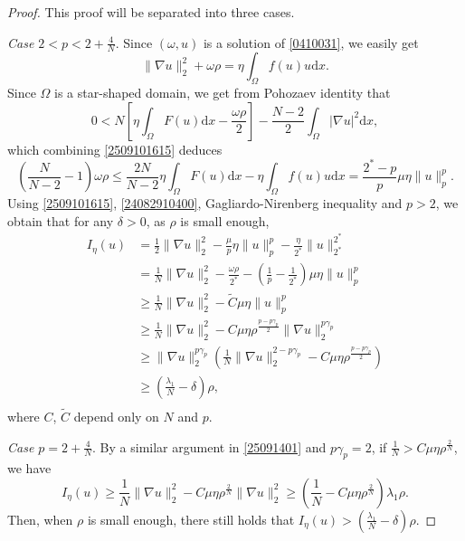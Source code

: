 \documentclass[10pt]{article}
\numberwithin{equation}{section}
\newcommand{\ud}{\mathrm{d}}
\numberwithin{equation}{section}
\begin{document}
\begin{proof}
This proof will be separated into three cases.

{\it Case $2<p< 2+\frac{4}{N}$}. Since $(\omega, u)$ is a solution of \eqref{0410031}, we easily get
\begin{equation}\label{2509101615}
\|\nabla u\|_2^2+\omega\rho=\eta\int_{\Omega}f(u)u\ud x.
\end{equation}
Since $\Omega$ is a star-shaped domain, we get from Pohozaev identity that
\begin{equation}\label{2509111048}
0< N\left[\eta\int_{\Omega}F(u)\ud x-\frac{\omega\rho}{2}\right]-\frac{N-2}{2}\int_{\Omega}|\nabla u|^2 \ud x,
\end{equation}
which combining \eqref{2509101615} deduces
\begin{equation}\label{24082910400}
\left(\frac{N}{N-2}-1\right)\omega\rho\le \frac{2N}{N-2}\eta\int_{\Omega}F(u)\ud x-\eta\int_{\Omega}f(u)u \ud x=\frac{2^*-p}{p}\mu\eta\|u\|_p^p.
\end{equation}
Using \eqref{2509101615}, \eqref{24082910400}, Gagliardo-Nirenberg inequality and $p>2$, we obtain that for any $\delta>0$, as $\rho$ is small enough, 
\begin{equation}\label{25091401}
\begin{aligned}
I_\eta(u)&=\frac{1}{2}\|\nabla u\|_2^2-\frac{\mu}{p}\eta\|u\|_p^p-\frac{\eta}{2^*}\|u\|_{2^*}^{2^*}\\
&= \frac{1}{N}\|\nabla u\|_2^2-\frac{\omega\rho}{2^*}-\left(\frac{1}{p}-\frac{1}{2^*}\right)\mu\eta\|u\|_p^p\\
&\ge \frac{1}{N}\|\nabla u\|_2^2-\widetilde{C}\mu\eta\|u\|_p^p\\
&\ge \frac{1}{N}\|\nabla u\|_2^2-C\mu\eta\rho^{\frac{p-p\gamma_p}{2}}\|\nabla u\|_2^{p\gamma_p}\\
&\ge \|\nabla u\|_2^{p\gamma_p}\left(\frac{1}{N}\|\nabla u\|_2^{2-p\gamma_p}-C\mu\eta\rho^{\frac{p-p\gamma_p}{2}}\right)\\
&\ge\left(\frac{\lambda_1}{N}-\delta\right)\rho,\\
\end{aligned}
\end{equation}
 where $C$, $\widetilde{C}$ depend only on $N$ and $p$. 
 
 \smallskip
{\it Case $p=2+\frac{4}{N}$}. By a similar argument in \eqref{25091401} and $p\gamma_p=2$, if $\frac{1}{N}>C\mu\eta\rho^{\frac{2}{N}}$, we have
\begin{equation*}
I_\eta(u)\ge \frac{1}{N}\|\nabla u\|_2^2-C\mu\eta\rho^{\frac{2}{N}}\|\nabla u\|_2^{2}
\ge\left(\frac{1}{N}-C\mu\eta\rho^{\frac{2}{N}}\right)\lambda_1\rho.
\end{equation*}
Then, when $\rho$ is small enough, there still holds that $I_\eta(u)>\left(\frac{\lambda_1}{N}-\delta\right)\rho$.


\end{proof}
\end{document}
